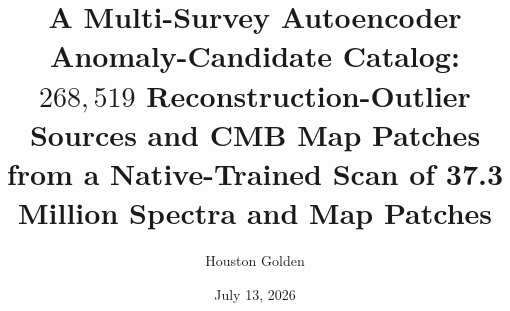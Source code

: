 \documentclass[aps,prd,twocolumn,superscriptaddress,showpacs,preprintnumbers,nofootinbib,longbibliography,floatfix]{revtex4-2}
\begin{document}

\title{A Multi-Survey Autoencoder Anomaly-Candidate Catalog: $268{,}519$ Reconstruction-Outlier Sources and CMB Map Patches\\
from a Native-Trained Scan of 37.3 Million Spectra and Map Patches}

\author{Houston Golden}

\date{July 13, 2026}  %
\end{document}
